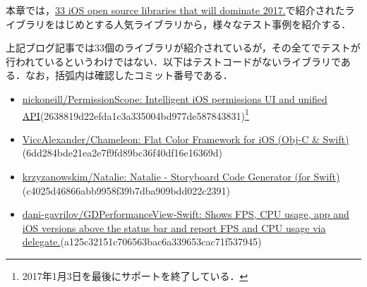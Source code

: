 本章では，\href{https://medium.com/app-coder-io/33-ios-open-source-libraries-that-will-dominate-2017-4762cf3ce449}{33 iOS open source libraries that will dominate 2017.}で紹介されたライブラリをはじめとする人気ライブラリから，様々なテスト事例を紹介する．

上記ブログ記事では33個のライブラリが紹介されているが，その全てでテストが行われているというわけではない．以下はテストコードがないライブラリである．なお，括弧内は確認したコミット番号である．

\begin{itemize}
    \item \href{https://github.com/nickoneill/PermissionScope}{nickoneill/PermissionScope: Intelligent iOS permissions UI and unified API}(2638819d22efda1c3a335004bd977de587843831)\footnote{2017年1月3日を最後にサポートを終了している．}
    \item \href{https://github.com/ViccAlexander/Chameleon}{ViccAlexander/Chameleon: Flat Color Framework for iOS (Obj-C \& Swift)}(6dd284bde21ea2e7f9fd89bc36f40df16e16369d)
    \item \href{https://github.com/krzyzanowskim/Natalie}{krzyzanowskim/Natalie: Natalie - Storyboard Code Generator (for Swift)}(c4025d46866abb9958f39b7dba909bdd022c2391)
    \item \href{https://github.com/dani-gavrilov/GDPerformanceView-Swift}{dani-gavrilov/GDPerformanceView-Swift: Shows FPS, CPU usage, app and iOS versions above the status bar and report FPS and CPU usage via delegate.}(a125c32151c706563bac6a339653cac71f537945)
\end{itemize}

